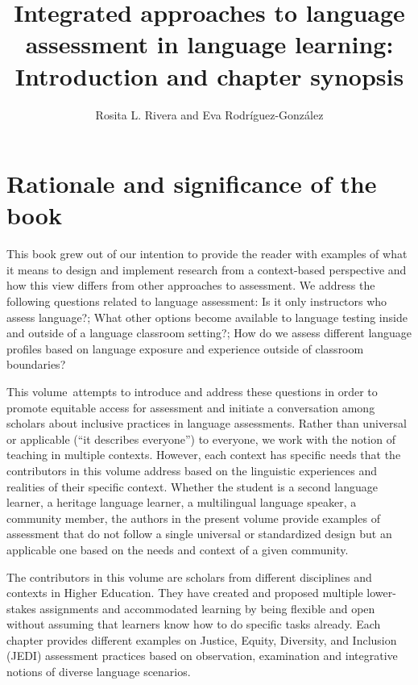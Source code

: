 \documentclass[output=paper]{langscibook}
\author{Rosita L. Rivera\affiliation{University of Puerto Rico-Mayagüez} and Eva Rodríguez-González\affiliation{University of New Mexico}}
\title{Integrated approaches to language assessment in language learning: Introduction and chapter synopsis}
\begin{document}

\maketitle









\section{Rationale and significance of the book}



This book grew out of our intention to provide the reader with examples of what it means to design and implement research from a context-based perspective and how this view differs from other approaches to assessment. We address the following questions related to language assessment: Is it only instructors who assess language?; What other options become available to language testing inside and outside of a language classroom setting?; How do we assess different language profiles based on language exposure and experience outside of classroom boundaries?



This volume~attempts to introduce and address these questions in order to promote equitable access for assessment and initiate a conversation among scholars about inclusive practices in language assessments. Rather than universal or applicable (“it describes everyone”) to everyone, we work with the notion of teaching in multiple contexts. However, each context has specific needs that the contributors in this volume address based on the linguistic experiences and realities of their specific context. Whether the student is a second language learner, a heritage language learner, a multilingual language speaker, a community member, the authors in the present volume provide examples of assessment that do not follow a single universal or standardized design but an applicable one based on the needs and context of a given community.



The contributors in this volume are scholars from different disciplines and contexts in Higher Education. They have created and proposed multiple lower-stakes assignments and accommodated learning by being flexible and open without assuming that learners know how to do specific tasks already. Each chapter provides different examples on Justice, Equity, Diversity, and Inclusion (JEDI) assessment practices based on observation, examination and integrative notions of diverse language scenarios.
\end{document}

